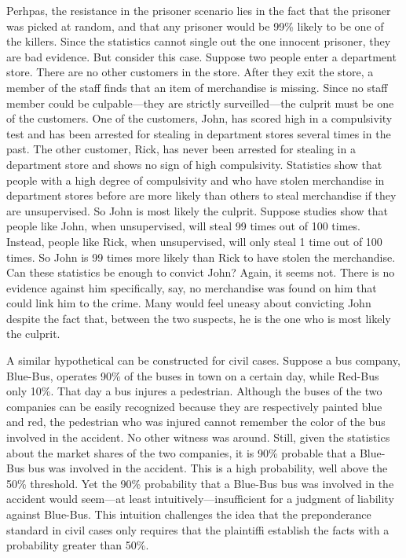 \documentclass[
  10pt,
  dvipsnames,enabledeprecatedfontcommands]{scrartcl}
\begin{document}
Perhpas, the resistance in the prisoner scenario lies in the fact that
the prisoner was picked at random, and that any prisoner would be 99\%
likely to be one of the killers. Since the statistics cannot single out
the one innocent prisoner, they are bad evidence. But consider this
case. Suppose two people enter a department store. There are no other
customers in the store. After they exit the store, a member of the staff
finds that an item of merchandise is missing. Since no staff member
could be culpable---they are strictly surveilled---the culprit must be
one of the customers. One of the customers, John, has scored high in a
compulsivity test and has been arrested for stealing in department
stores several times in the past. The other customer, Rick, has never
been arrested for stealing in a department store and shows no sign of
high compulsivity. Statistics show that people with a high degree of
compulsivity and who have stolen merchandise in department stores before
are more likely than others to steal merchandise if they are
unsupervised. So John is most likely the culprit. Suppose studies show
that people like John, when unsupervised, will steal 99 times out of 100
times. Instead, people like Rick, when unsupervised, will only steal 1
time out of 100 times. So John is 99 times more likely than Rick to have
stolen the merchandise. Can these statistics be enough to convict John?
Again, it seems not. There is no evidence against him specifically, say,
no merchandise was found on him that could link him to the crime. Many
would feel uneasy about convicting John despite the fact that, between
the two suspects, he is the one who is most likely the culprit.

A similar hypothetical can be constructed for civil cases. Suppose a bus
company, Blue-Bus, operates 90\% of the buses in town on a certain day,
while Red-Bus only 10\%. That day a bus injures a pedestrian. Although
the buses of the two companies can be easily recognized because they are
respectively painted blue and red, the pedestrian who was injured cannot
remember the color of the bus involved in the accident. No other witness
was around. Still, given the statistics about the market shares of the
two companies, it is 90\% probable that a Blue-Bus bus was involved in
the accident. This is a high probability, well above the 50\% threshold.
Yet the 90\% probability that a Blue-Bus bus was involved in the
accident would seem---at least intuitively---insufficient for a judgment
of liability against Blue-Bus. This intuition challenges the idea that
the preponderance standard in civil cases only requires that the
plaintiffi establish the facts with a probability greater than 50\%.
\end{document}
